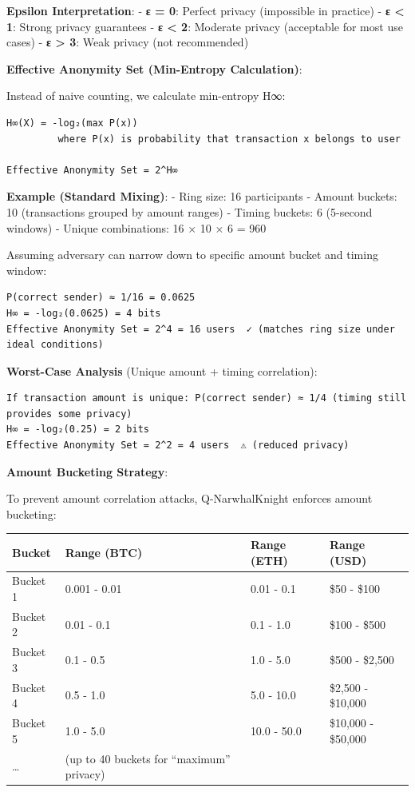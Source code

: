 \documentclass[
  11pt,
]{article}
\begin{document}
\textbf{Epsilon Interpretation}: - \textbf{ε = 0}: Perfect privacy
(impossible in practice) - \textbf{ε \textless{} 1}: Strong privacy
guarantees - \textbf{ε \textless{} 2}: Moderate privacy (acceptable for
most use cases) - \textbf{ε \textgreater{} 3}: Weak privacy (not
recommended)

\textbf{Effective Anonymity Set (Min-Entropy Calculation)}:

Instead of naive counting, we calculate min-entropy H∞:

\begin{verbatim}
H∞(X) = -log₂(max P(x))
         where P(x) is probability that transaction x belongs to user

Effective Anonymity Set = 2^H∞
\end{verbatim}

\textbf{Example (Standard Mixing)}: - Ring size: 16 participants -
Amount buckets: 10 (transactions grouped by amount ranges) - Timing
buckets: 6 (5-second windows) - Unique combinations: 16 × 10 × 6 = 960

Assuming adversary can narrow down to specific amount bucket and timing
window:

\begin{verbatim}
P(correct sender) ≈ 1/16 = 0.0625
H∞ = -log₂(0.0625) = 4 bits
Effective Anonymity Set = 2^4 = 16 users  ✓ (matches ring size under ideal conditions)
\end{verbatim}

\textbf{Worst-Case Analysis} (Unique amount + timing correlation):

\begin{verbatim}
If transaction amount is unique: P(correct sender) ≈ 1/4 (timing still provides some privacy)
H∞ = -log₂(0.25) = 2 bits
Effective Anonymity Set = 2^2 = 4 users  ⚠️ (reduced privacy)
\end{verbatim}

\textbf{Amount Bucketing Strategy}:

To prevent amount correlation attacks, Q-NarwhalKnight enforces amount
bucketing:

\begin{longtable}[]{@{}llll@{}}
\toprule
Bucket & Range (BTC) & Range (ETH) & Range (USD) \\
\midrule
\endhead
Bucket 1 & 0.001 - 0.01 & 0.01 - 0.1 & \$50 - \$100 \\
Bucket 2 & 0.01 - 0.1 & 0.1 - 1.0 & \$100 - \$500 \\
Bucket 3 & 0.1 - 0.5 & 1.0 - 5.0 & \$500 - \$2,500 \\
Bucket 4 & 0.5 - 1.0 & 5.0 - 10.0 & \$2,500 - \$10,000 \\
Bucket 5 & 1.0 - 5.0 & 10.0 - 50.0 & \$10,000 - \$50,000 \\
\ldots{} & (up to 40 buckets for ``maximum'' privacy) & & \\
\bottomrule
\end{longtable}
\end{document}
